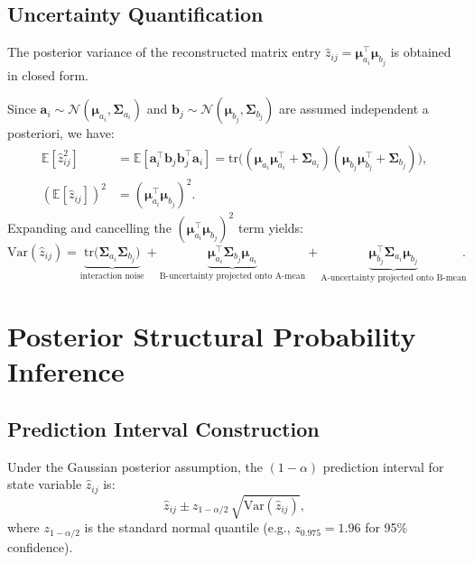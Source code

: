 \documentclass[11pt,a4paper]{article}
\newcommand{\N}{\mathcal{N}}
\newcommand{\tr}{\mathrm{tr}}
\begin{document}
\subsection{Uncertainty Quantification}
\label{sec:uncertainty}
The posterior variance of the reconstructed matrix entry $\hat{z}_{ij} = \bm{\mu}_{a_i}^\top \bm{\mu}_{b_j}$ is obtained in closed form.

Since $\bm{a}_i \sim \N(\bm{\mu}_{a_i}, \bm{\Sigma}_{a_i})$ and $\bm{b}_j \sim \N(\bm{\mu}_{b_j}, \bm{\Sigma}_{b_j})$ are assumed independent a posteriori, we have:
\begin{align}
  \mathbb{E}[\hat{z}_{ij}^2]
  &= \mathbb{E}[\bm{a}_i^\top \bm{b}_j \bm{b}_j^\top \bm{a}_i]
  = \tr\!\bigl((\bm{\mu}_{a_i}\bm{\mu}_{a_i}^\top + \bm{\Sigma}_{a_i})
  (\bm{\mu}_{b_j}\bm{\mu}_{b_j}^\top + \bm{\Sigma}_{b_j})\bigr), \\
  (\mathbb{E}[\hat{z}_{ij}])^2
  &= (\bm{\mu}_{a_i}^\top \bm{\mu}_{b_j})^2.
\end{align}
Expanding and cancelling the $(\bm{\mu}_{a_i}^\top\bm{\mu}_{b_j})^{2}$ term yields:
\begin{equation}\label{eq:var_z}
  \boxed{\mathrm{Var}(\hat{z}_{ij})
  = \underbrace{\tr\!\bigl(\bm{\Sigma}_{a_i}\bm{\Sigma}_{b_j}\bigr)}_{\text{interaction noise}}
  + \underbrace{\bm{\mu}_{a_i}^\top \bm{\Sigma}_{b_j}\bm{\mu}_{a_i}}_{\text{B-uncertainty projected onto A-mean}}
  + \underbrace{\bm{\mu}_{b_j}^\top \bm{\Sigma}_{a_i}\bm{\mu}_{b_j}}_{\text{A-uncertainty projected onto B-mean}}}.
\end{equation}

\section{Posterior Structural Probability Inference}
\label{sec:posterior}

\subsection{Prediction Interval Construction}
Under the Gaussian posterior assumption, the $(1-\alpha)$ prediction interval for state variable $\hat{z}_{ij}$ is:
\begin{equation}\label{eq:pi}
  \hat{z}_{ij} \pm z_{1-\alpha/2}\, \sqrt{\mathrm{Var}(\hat{z}_{ij})},
\end{equation}
where $z_{1-\alpha/2}$ is the standard normal quantile (e.g., $z_{0.975} = 1.96$ for 95\% confidence).
\end{document}
